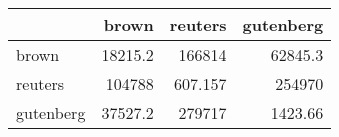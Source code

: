 \begin{tabular}{lrrr}
\hline
           &    brown &    reuters &   gutenberg \\
\hline
 brown     &  18215.2 & 166814     &    62845.3  \\
 reuters   & 104788   &    607.157 &   254970    \\
 gutenberg &  37527.2 & 279717     &     1423.66 \\
\hline
\end{tabular}